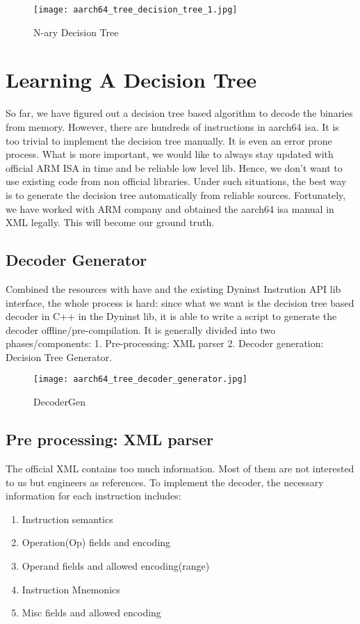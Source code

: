 \documentclass[]{article}
\begin{document}
\begin{figure}[h]
	\texttt{[image: aarch64\_tree\_decision\_tree\_1.jpg]}
	\caption{N-ary Decision Tree}
	\label{fig:ndecisiontree}
\end{figure}

\section{Learning A Decision Tree}
So far, we have figured out a decision tree based algorithm to decode the binaries from memory. However, there are hundreds of instructions in aarch64 isa. It is too trivial to implement the decision tree manually. It is even an error prone process. What is 
more important, we would like to always stay updated with official ARM ISA in time and be reliable low level lib. Hence, we don't want to use existing code from non official libraries. Under such situations, the best way is to generate the decision tree automatically from reliable sources. Fortunately, we have worked with ARM company and obtained the aarch64 isa manual in XML legally. This will 
become our ground truth.

\subsection{Decoder Generator}
Combined the resources with have and the existing Dyninst Instrution API lib interface, the whole process is hard: since what we want is the decision tree based decoder in C++ in the Dyninst lib, it is able to write a script to generate the decoder offline/pre-compilation.
It is generally divided into two phases/components: 1. Pre-processing: XML parser 2. Decoder generation: Decision Tree Generator.

\begin{figure}[h]
	\texttt{[image: aarch64\_tree\_decoder\_generator.jpg]}
	\caption{DecoderGen}
	\label{fig:decodergen}
\end{figure}

\subsection{Pre processing: XML parser}
The official XML contains too much information. Most of them are not interested to us but engineers as references. To implement the decoder, the necessary information for each instruction includes:
\begin{enumerate}
	\item Instruction semantics
	\item Operation(Op) fields and encoding
	\item Operand fields and allowed encoding(range)
	\item Instruction Mnemonics
	\item Misc fields and allowed encoding
\end{enumerate}
\end{document}
